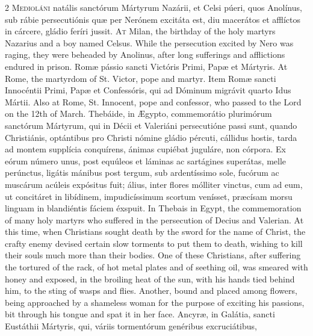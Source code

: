 \begin{paracol}{2}
\lettrine[lines=2]{M}{edioláni} natális 
 sanctórum Mártyrum Nazárii, et Celsi púeri, quos Anolínus, sub rábie 
 persecutiónis quæ per Nerónem excitáta est, diu macerátos et afflíctos in cárcere, gládio feríri jussit.
\switchcolumn
{}
\lettrine[lines=2]{A}{t} Milan, the birthday of the holy 
 martyrs Nazarius and a boy named Celsus. While the persecution excited 
 by Nero was raging, they were beheaded by Anolinus, after long sufferings 
 and afflictions endured in prison.
\switchcolumn*
{}
Romæ pássio sancti 
 Victóris Primi, Papæ et Mártyris.
\switchcolumn
{}
At Rome, the martyrdom of St. 
 Victor, pope and martyr.
\switchcolumn*
{}
Item Romæ sancti 
 Innocéntii Primi, Papæ et Confessóris, qui ad Dóminum migrávit quarto Idus 
 Mártii.
\switchcolumn
{}
Also at Rome, St. Innocent, pope and 
 confessor, who passed to the Lord on the 12th of March.
\switchcolumn*
{}
Thebáide, in Ægypto, 
 commemorátio plurimórum sanctórum Mártyrum, qui in Décii et Valeriáni 
 persecutióne passi sunt, quando Christiánis, optántibus pro Christi nómine 
 gládio pércuti, cállidus hostis, tarda ad montem supplícia conquírens, 
 ánimas cupiébat juguláre, non córpora. Ex eórum número unus, post 
 equúleos et láminas ac sartágines superátas, melle perúnctus, ligátis 
 mánibus post tergum, sub ardentíssimo sole, fucórum ac muscárum acúleis 
 expósitus fuit; álius, inter flores mólliter vinctus, cum ad eum, ut 
 concitáret in libídinem, impudicíssimum scortum venísset, præcísam morsu 
 linguam in blandiéntis fáciem éxspuit.
\switchcolumn
{}
In Thebais in Egypt, the 
 commemoration of many holy martyrs who suffered in the persecution of Decius 
 and Valerian. At this time, when Christians sought death by the sword 
 for the name of Christ, the crafty enemy devised certain slow torments to put 
 them to death, wishing to kill their souls much more than their bodies. 
 One of these Christians, after suffering the tortured of the rack, of hot 
 metal plates and of seething oil, was smeared with honey and exposed, in the 
 broiling heat of the sun, with his hands tied behind him, to the sting of 
 wasps and flies. Another, bound and placed among flowers, being 
 approached by a shameless woman for the purpose of exciting his passions, 
 bit through his tongue and spat it in her face.
\switchcolumn*
{}
Ancyræ, in Galátia, sancti Eustáthii Mártyris, qui, váriis tormentórum genéribus excruciátibus, 

\end{paracol}
